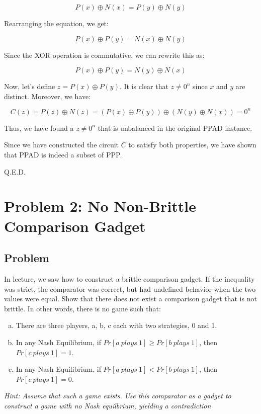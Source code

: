 \documentclass{article}
\begin{document}
\[
P(x) \oplus N(x) = P(y) \oplus N(y)
\]

Rearranging the equation, we get:

\[
P(x) \oplus P(y) = N(x) \oplus N(y)
\]

Since the XOR operation is commutative, we can rewrite this as:

\[
P(x) \oplus P(y) = N(y) \oplus N(x)
\]

Now, let's define \(z = P(x) \oplus P(y)\). It is clear that \(z \neq 0^n\) since \(x\) and \(y\) are distinct. Moreover, we have:

\[
C(z) = P(z) \oplus N(z) = (P(x) \oplus P(y)) \oplus (N(y) \oplus N(x)) = 0^n
\]

Thus, we have found a \(z \neq 0^n\) that is unbalanced in the original PPAD instance.

Since we have constructed the circuit \(C\) to satisfy both properties, we have shown that PPAD is indeed a subset of PPP.

Q.E.D.



\section{Problem 2: No Non-Brittle Comparison Gadget}

\subsection{Problem}
In lecture, we saw how to construct a brittle comparison gadget. If the inequality was strict, the comparator was correct, but had undefined behavior when the two values were equal. Show that there does not exist a comparison gadget that is not brittle. In other words, there is no game such that:

\begin{enumerate}[(a)]
    \item There are three players, a, b, c each with two strategies, 0 and 1.
    \item  In any Nash Equilibrium, if \(Pr[a~plays~1] \ge Pr[b~plays~1]\), then \(Pr[c~plays~1] = 1\).
    \item In any Nash Equilibrium, if \(Pr[a~plays~1] < Pr[b~plays~1]\), then \(Pr[c~plays~1] = 0\).
\end{enumerate}

\textit{Hint: Assume that such a game exists. Use this comparator as a gadget to construct a game with no Nash equilbrium, yielding a contradiction}
\end{document}
